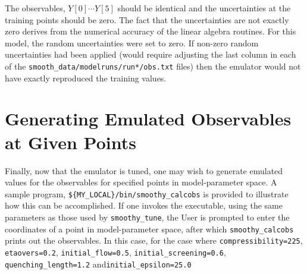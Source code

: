 \documentclass[UserManual.tex]{subfiles}
\begin{document}
The observables, $Y[0]\cdots Y[5]$ should be identical and the uncertainties at the training points should be zero. The fact that the uncertainties are not exactly zero derives from the numerical accuracy of the linear algebra routines. For this model, the random uncertainties were set to zero. If non-zero random uncertainties had been applied (would require adjusting the last column in each of the {\tt smooth\_data/modelruns/run*/obs.txt} files) then the emulator would not have exactly reproduced the training values.

\section{Generating Emulated Observables at Given Points}
Finally, now that the emulator is tuned, one may wish to generate emulated values for the observables for specified points in model-parameter space. A sample program, {\tt \$\{MY\_LOCAL\}/bin/smoothy\_calcobs} is provided to illustrate how this can be accomplished. If one invokes the executable, using the same parameters as those used by {\tt smoothy\_tune}, the User is prompted to enter the coordinates of a point in model-parameter space, after which {\tt smoothy\_calcobs} prints out the observables. In this case, for the case where {\tt compressibility=225}, {\tt etaovers=0.2}, {\tt initial\_flow=0.5}, {\tt initial\_screening=0.6}, {\tt quenching\_length=1.2} and{\tt initial\_epsilon=25.0}
\end{document}
